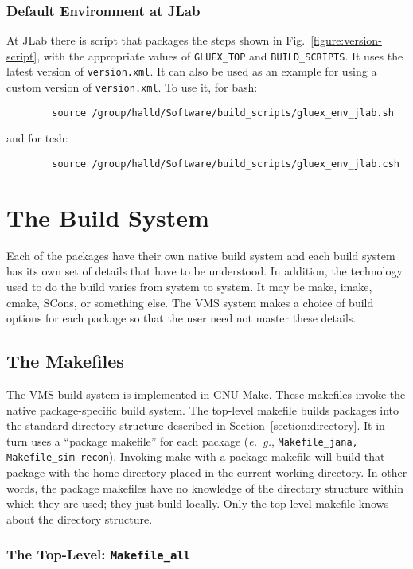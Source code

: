 \documentclass[12pt]{article}
\begin{document}
\subsubsection{Default Environment at JLab}

At JLab there is script that packages the steps shown in Fig.~\ref{figure:version-script}, with the appropriate values of {\tt GLUEX\_TOP} and {\tt BUILD\_SCRIPTS}. It uses the latest version of {\tt version.xml}. It can also be used as an example for using a custom version of {\tt version.xml}. To use it, for bash:
\begin{verbatim}
        source /group/halld/Software/build_scripts/gluex_env_jlab.sh
\end{verbatim}
and for tcsh:
\begin{verbatim}
        source /group/halld/Software/build_scripts/gluex_env_jlab.csh
\end{verbatim}

\section{The Build System}

Each of the packages have their own native build system and each build
system has its own set of details that have to be understood. In
addition, the technology used to do the build varies from system to
system. It may be make, imake, cmake, SCons, or something else. The
VMS system makes a choice of build options for each package so that
the user need not master these details.

\subsection{The Makefiles}

The VMS build system is implemented in GNU Make. These makefiles
invoke the native package-specific build system. The top-level
makefile builds packages into the standard directory structure
described in Section~\ref{section:directory}. It in turn uses a
``package
makefile'' for each package ({\it e.~g.}, {\tt Makefile\_jana,
  Makefile\_sim-recon}). Invoking make with a package makefile will
build that package with the home directory placed in the current
working directory. In other words, the package makefiles have no knowledge of
the directory structure within which they are used; they just build
locally. Only the top-level makefile knows about the directory structure.

\subsubsection{The Top-Level: {\tt Makefile\_all}}
\end{document}
